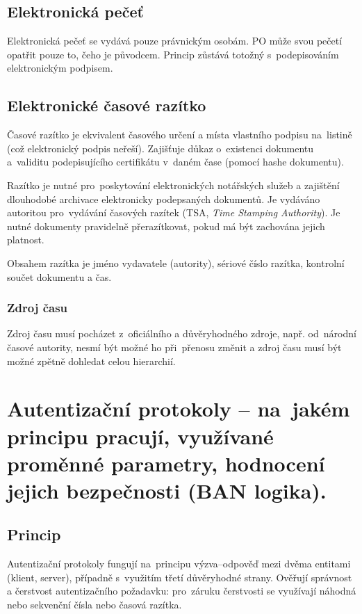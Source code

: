 \subsection{Elektronická pečeť}

Elektronická pečeť se vydává pouze právnickým osobám.
PO může svou pečetí opatřit pouze to, čeho je původcem.
Princip zůstává totožný s~podepisováním elektronickým podpisem.


\subsection{Elektronické časové razítko}

Časové razítko je ekvivalent časového určení a místa vlastního podpisu na~listině (což elektronický podpis neřeší).
Zajišťuje důkaz o~existenci dokumentu a~validitu podepisujícího certifikátu v~daném čase (pomocí hashe dokumentu).

Razítko je nutné pro~poskytování elektronických notářských služeb a zajištění dlouhodobé archivace elektronicky podepsaných dokumentů.
Je vydáváno autoritou pro~vydávání časových razítek (TSA, \emph{Time Stamping Authority}).
Je nutné dokumenty pravidelně přerazítkovat, pokud má být zachována jejich platnost.

Obsahem razítka je jméno vydavatele (autority), sériové číslo razítka, kontrolní součet dokumentu a čas.

\subsubsection{Zdroj času}

Zdroj času musí pocházet z~oficiálního a důvěryhodného zdroje, např. od~národní časové autority, nesmí být možné ho při~přenosu změnit a zdroj času musí být možné zpětně dohledat celou hierarchií.


\clearpage
\section{Autentizační protokoly -- na~jakém principu pracují, využívané proměnné parametry, hodnocení jejich bezpečnosti (BAN logika).}

\subsection{Princip}

Autentizační protokoly fungují na~principu výzva--odpověď mezi dvěma entitami (klient, server), případně s~využitím třetí důvěryhodné strany.
Ověřují správnost a čerstvost autentizačního požadavku: pro~záruku čerstvosti se využívají náhodná nebo sekvenční čísla nebo časová razítka.


